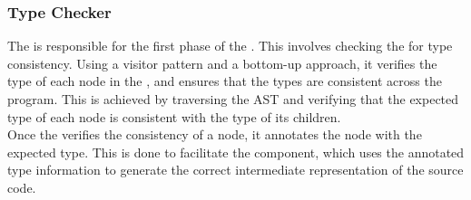 \subsubsection{Type Checker}

The \typeChecker{} is responsible for the first phase of the \static. This involves
checking the \ast{} for type consistency. Using a visitor pattern and a bottom-up
approach, it verifies the type of each node in the \ast{}, and ensures that the types
are consistent across the program. This is achieved by traversing the AST and
verifying that the expected type of each node is consistent with the type of its
children. \\

Once the \typeChecker{} verifies the consistency of a node, it annotates the node
with the expected type. This is done to facilitate the \codeGen{} component, which
uses the annotated type information to generate the correct intermediate
representation of the source code.


